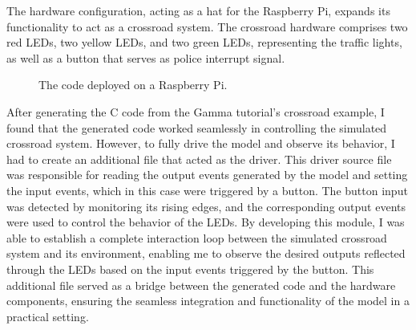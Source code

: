 The hardware configuration, acting as a hat for the Raspberry Pi, expands its functionality to act as a crossroad system. The crossroad hardware comprises two red LEDs, two yellow LEDs, and two green LEDs, representing the traffic lights, as well as a button that serves as police interrupt signal.

\begin{figure}[h]
	\centering
	\caption{The code deployed on a Raspberry Pi.}
	\label{fig:raspberry}
\end{figure}

After generating the C code from the Gamma tutorial's crossroad example, I found that the generated code worked seamlessly in controlling the simulated crossroad system. However, to fully drive the model and observe its behavior, I had to create an additional file that acted as the driver. This driver source file was responsible for reading the output events generated by the model and setting the input events, which in this case were triggered by a button. The button input was detected by monitoring its rising edges, and the corresponding output events were used to control the behavior of the LEDs. By developing this module, I was able to establish a complete interaction loop between the simulated crossroad system and its environment, enabling me to observe the desired outputs reflected through the LEDs based on the input events triggered by the button. This additional file served as a bridge between the generated code and the hardware components, ensuring the seamless integration and functionality of the model in a practical setting.

